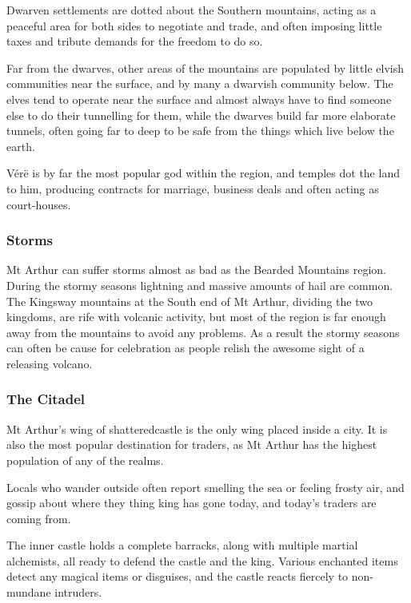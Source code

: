 \begin{multicols}{2}
Dwarven settlements are dotted about the Southern mountains, acting as a peaceful area for both sides to negotiate and trade, and often imposing little taxes and tribute demands for the freedom to do so.

Far from the dwarves, other areas of the mountains are populated by little elvish communities near the surface, and by many a dwarvish community below.  The elves tend to operate near the surface and almost always have to find someone else to do their tunnelling for them, while the dwarves build far more elaborate tunnels, often going far to deep to be safe from the things which live below the earth.

V\'{e}r\"{e} is by far the most popular god within the region, and temples dot the land to him, producing contracts for marriage, business deals and often acting as court-houses.

\subsubsection{Storms}

Mt Arthur can suffer storms almost as bad as the Bearded Mountains region.
During the stormy seasons lightning and massive amounts of hail are common.
The Kingsway mountains at the South end of Mt Arthur, dividing the two kingdoms, are rife with volcanic activity, but most of the region is far enough away from the mountains to avoid any problems.
As a result the stormy seasons can often be cause for celebration as people relish the awesome sight of a releasing volcano.

\subsubsection{The Citadel}

Mt Arthur's wing of \gls{shatteredcastle} is the only wing placed inside a city.
It is also the most popular destination for traders, as Mt Arthur has the highest population of any of the realms.

Locals who wander outside often report smelling the sea or feeling frosty air, and gossip about where they thing \gls{king} has gone today, and today's traders are coming from.

The inner castle holds a complete barracks, along with multiple martial alchemists, all ready to defend the castle and the king.
Various enchanted items detect any magical items or disguises, and the castle reacts fiercely to non-mundane intruders.


\end{multicols}
